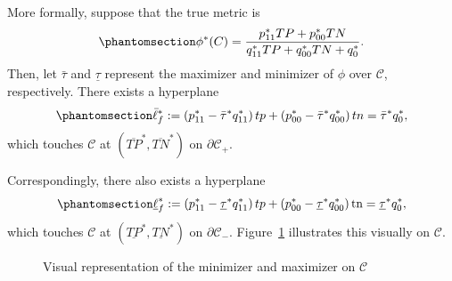 \documentclass[
  letterpaper,
  numbers=noenddot,
  DIV=11]{scrreprt}
\theoremstyle{definition}
\theoremstyle{plain}
\theoremstyle{plain}
\theoremstyle{remark}
\begin{document}
More formally, suppose that the true metric is
\begin{equation}\phantomsection\label{eq-eq3.48}{\phi^{*}(C)=\frac{p_{11}^{*} T P+p_{00}^{*} T N}{q_{11}^{*} T P+q_{00}^{*} T N+q_{0}^{*}}.}\end{equation}
Then, let \(\bar{\tau}\) and \(\underline{\tau}\) represent the
maximizer and minimizer of \(\phi\) over \(\mathcal{C}\), respectively.
There exists a hyperplane
\begin{equation}\phantomsection\label{eq-eq3.49}{\begin{aligned}
\bar{\ell}_{f}^{*}:=\left(p_{11}^{*}-\bar{\tau}^{*} q_{11}^{*}\right) t p+\left(p_{00}^{*}-\bar{\tau}^{*} q_{00}^{*}\right) t n=\bar{\tau}^{*} q_{0}^{*},
\end{aligned}}\end{equation} which touches \(\mathcal{C}\) at
\(\left(\overline{T P}^{*}, \overline{T N}^{*}\right)\) on
\(\partial \mathcal{C}_{+}\).

Correspondingly, there also exists a hyperplane
\begin{equation}\phantomsection\label{eq-eq3.50}{\begin{aligned}
\underline{\ell}_{f}^{*}:=\left(p_{11}^{*}-\underline{\tau}^{*} q_{11}^{*}\right) t p+\left(p_{00}^{*}-\underline{\tau}^{*} q_{00}^{*}\right) \operatorname{tn}=\underline{\tau}^{*} q_{0}^{*},
\end{aligned}}\end{equation} which touches \(\mathcal{C}\) at
\(\left(\underline{TP}^{*}, \underline{T N}^{*}\right)\) on
\(\partial \mathcal{C}_{-}\). Figure~\ref{fig-minmax} illustrates this
visually on \(\mathcal{C}\).

\begin{figure}


\caption{\label{fig-minmax}Visual representation of the minimizer and
maximizer on \(\mathcal{C}\)}

\end{figure}%
\end{document}

